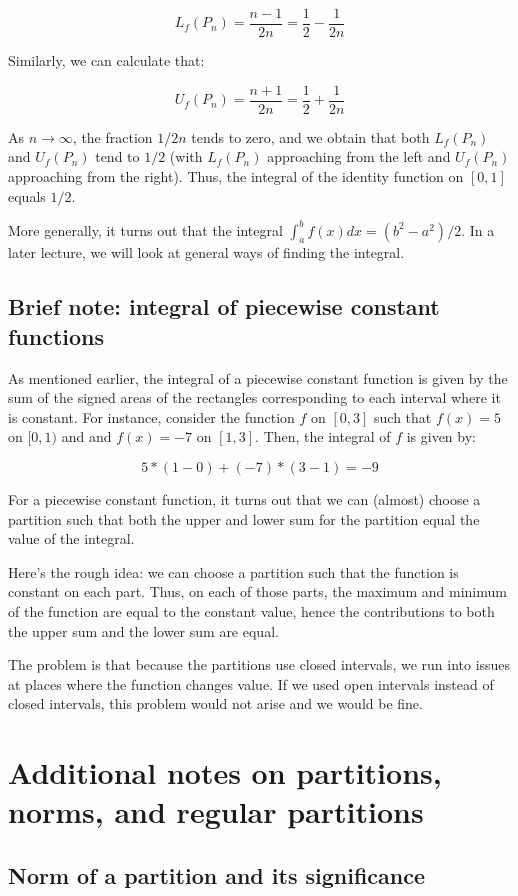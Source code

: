 \documentclass{amsart}
\begin{document}
$$L_f(P_n) = \frac{n - 1}{2n} = \frac{1}{2} - \frac{1}{2n}$$

Similarly, we can calculate that:

$$U_f(P_n) = \frac{n + 1}{2n} = \frac{1}{2} + \frac{1}{2n}$$

As $n \to \infty$, the fraction $1/2n$ tends to zero, and we obtain
that both $L_f(P_n)$ and $U_f(P_n)$ tend to $1/2$ (with $L_f(P_n)$
approaching from the left and $U_f(P_n)$ approaching from the
right). Thus, the integral of the identity function on $[0,1]$ equals
$1/2$.

More generally, it turns out that the integral $\int_a^b f(x) dx =
(b^2 - a^2)/2$. In a later lecture, we will look at general ways of
finding the integral.

\subsection{Brief note: integral of piecewise constant functions}

As mentioned earlier, the integral of a piecewise constant function is
given by the sum of the signed areas of the rectangles corresponding to
each interval where it is constant. For instance, consider the
function $f$ on $[0,3]$ such that $f(x) = 5$ on $[0,1)$ and and $f(x)
= -7$ on $[1,3]$. Then, the integral of $f$ is given by:

$$5 * (1 - 0) + (-7) * (3 - 1) = -9$$

For a piecewise constant function, it turns out that we can (almost)
choose a partition such that both the upper and lower sum for the
partition equal the value of the integral. 

Here's the rough idea: we can choose a partition such that the
function is constant on each part. Thus, on each of those parts, the
maximum and minimum of the function are equal to the constant value,
hence the contributions to both the upper sum and the lower sum are
equal.

The problem is that because the partitions use closed intervals, we
run into issues at places where the function changes value. If we used
open intervals instead of closed intervals, this problem would not
arise and we would be fine.

\section{Additional notes on partitions, norms, and regular partitions}

\subsection{Norm of a partition and its significance}
\end{document}
